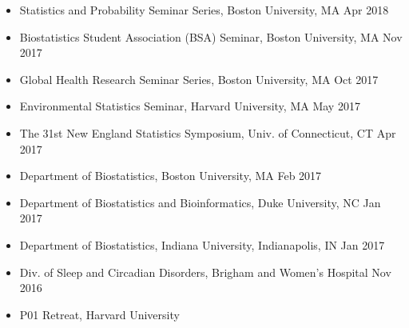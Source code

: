 \documentclass[10pt]{article}
\newenvironment{innerlist}[1][\enskip\textbullet]%
        {\begin{itemize}[#1,leftmargin=*,parsep=0pt,itemsep=0pt,topsep=0pt,partopsep=0pt]}
        {\end{itemize}}
\begin{document}
\begin{innerlist}
\item[] Statistics and Probability Seminar Series, Boston University, MA
  \hfill Apr 2018\\
\item[] Biostatistics Student Association (BSA) Seminar, Boston University, MA \hfill Nov 2017\\
\item[] Global Health Research Seminar Series, Boston University, MA \hfill Oct 2017\\
\item[] Environmental Statistics Seminar, Harvard University, MA
  \hfill May 2017\\
\item[] The 31st New England Statistics Symposium, Univ. of Connecticut, CT
  \hfill Apr 2017\\
\item[] Department of Biostatistics, Boston University, MA
  \hfill Feb 2017 \\
\item[] Department of Biostatistics and Bioinformatics, Duke University, NC
  \hfill Jan 2017 \\
\item[] Department of Biostatistics, Indiana University, Indianapolis, IN
  \hfill Jan 2017 \\
\item[] Div. of Sleep and Circadian Disorders, Brigham and Women's Hospital
  \hfill Nov 2016 \\
\item[] P01 Retreat, Harvard University

\end{innerlist}
\end{document}

